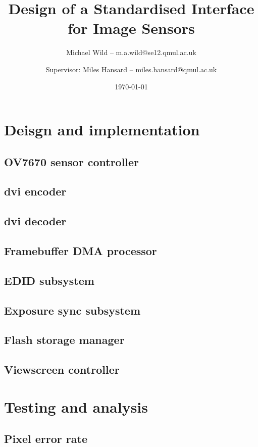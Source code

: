 \documentclass[a4paper,11pt]{report}
\title{Design of a Standardised Interface for Image Sensors}
\author{Michael Wild -- m.a.wild@se12.qmul.ac.uk \and Supervisor: Miles Hansard -- miles.hansard@qmul.ac.uk}
\date{\today}
\begin{document}
  \maketitle
  

  \tableofcontents
  \listoffigures
  \listoftables

  
  
  
  

  \chapter{Deisgn and implementation}
    \section{OV7670 sensor controller}
    \section{\gls{dvi} encoder}
    \section{\gls{dvi} decoder}
    \section{Framebuffer DMA processor}
    \section{EDID subsystem}
    \section{Exposure sync subsystem}
    \section{Flash storage manager}
    \section{Viewscreen controller}

  \chapter{Testing and analysis}
    \section{Pixel error rate}
\end{document}
